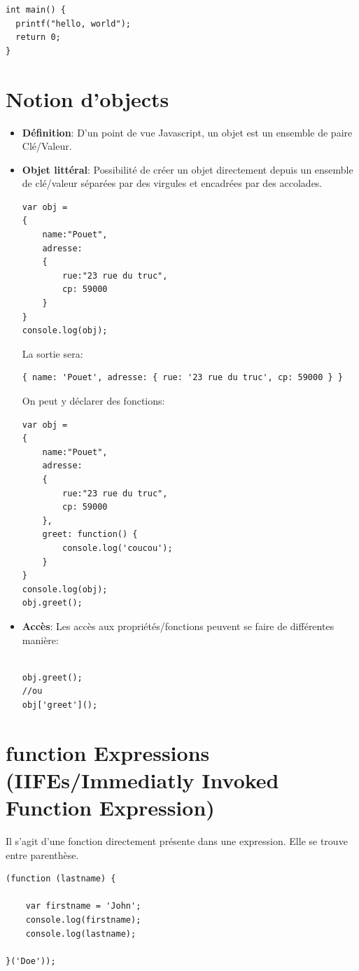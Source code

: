 \documentclass[12pt,oneside]{scrbook}
\begin{document}
\begin{verbatim}
int main() {
  printf("hello, world");
  return 0;
}
\end{verbatim}
\section{Notion d'objects}
\begin{itemize}
\item \textbf{Définition}: D'un point de vue Javascript, un objet est un ensemble de paire Clé/Valeur.
\item \textbf{Objet littéral}: Possibilité de créer un objet directement depuis un ensemble de clé/valeur séparées par des virgules et encadrées par des accolades.
\begin{verbatim}
var obj = 
{
    name:"Pouet",
    adresse:
    {
        rue:"23 rue du truc",
        cp: 59000
    }
}
console.log(obj);
\end{verbatim}
La sortie sera:
\begin{verbatim}
{ name: 'Pouet', adresse: { rue: '23 rue du truc', cp: 59000 } }
\end{verbatim}
On peut y déclarer des fonctions:
\begin{verbatim}
var obj = 
{
    name:"Pouet",
    adresse:
    {
        rue:"23 rue du truc",
        cp: 59000
    },
    greet: function() {
        console.log('coucou');
    }
}
console.log(obj);
obj.greet();
\end{verbatim}
\item \textbf{Accès}: Les accès aux propriétés/fonctions peuvent se faire de différentes manière:
\begin{verbatim}

obj.greet();
//ou
obj['greet']();
\end{verbatim}
\end{itemize}

\section{function Expressions (IIFEs/Immediatly Invoked Function Expression)}
Il s'agit d'une fonction directement présente dans une expression. Elle se trouve entre parenthèse.

\begin{verbatim}
(function (lastname) {

    var firstname = 'John';
    console.log(firstname);
    console.log(lastname);
	
}('Doe'));
\end{verbatim}
\end{document}
